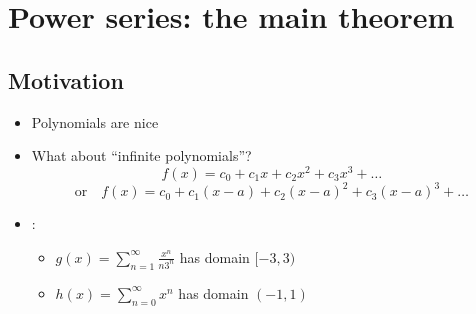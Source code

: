 \section{Power series: the main theorem}
\subsection*{Motivation}
\begin{itemize}
    \item Polynomials are nice
    \item What about ``infinite polynomials''? \\
          \[f(x) = c_0 + c_1x + c_2x^2 + c_3x^3 + \dots\]
          \[\text{or} \quad f(x) = c_0 + c_1 (x - a) + c_2 (x - a)^2 + c_3 (x - a)^3 + \dots\]
    \item \eg: \begin{itemize}
              \item \(g(x) = \sum_{n = 1}^{\infty} \frac{x^n}{n3^n}\) has domain \([-3, 3)\)
              \item \(h(x) = \sum_{n = 0}^{\infty} x^n\) has domain \((-1, 1)\)
          \end{itemize}
\end{itemize}

